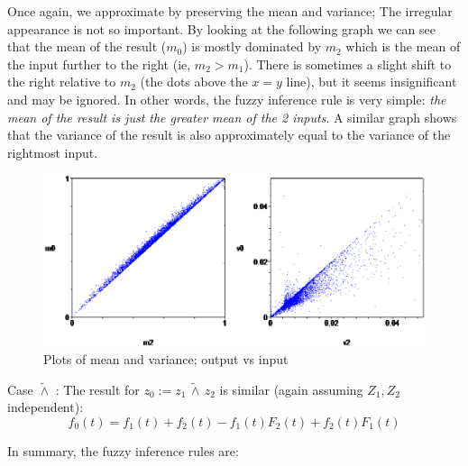 \documentclass[a4paper]{report}
\begin{document}
Once again, we approximate by preserving the mean and variance; The irregular appearance is not so important.  By looking at the following graph we can see that the mean of the result ($m_0$) is mostly dominated by $m_2$ which is the mean of the input further to the right (ie, $m_2 > m_1$).  There is sometimes a slight shift to the right relative to $m_2$ (the dots above the $x=y$ line), but it seems insignificant and may be ignored.  In other words, the fuzzy inference rule is very simple:  \textit{the mean of the result is just the greater mean of the 2 inputs}.  A similar graph shows that the variance of the result is also approximately equal to the variance of the rightmost input.
\begin{figure}[H]
\centering
\includegraphics[scale=0.8]{z1-OR-z2-M-and-V-plots.ps}
\caption{Plots of mean and variance; output vs input}
\end{figure}


Case $\widetilde{\wedge}$ : The result for $z_0 := z_1 \, \widetilde{\wedge} \, z_2$ is similar (again assuming $Z_1, Z_2$ independent):
\begin{equation}
f_0(t) = f_1(t) + f_2(t) - f_1(t) F_2(t) + f_2(t) F_1(t)
\end{equation}

In summary, the fuzzy inference rules are:
\end{document}
